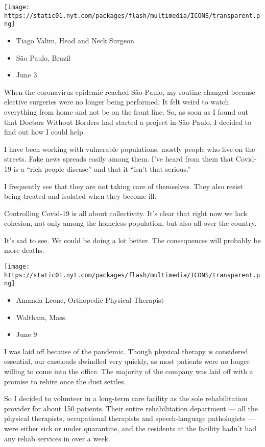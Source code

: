 \texttt{[image: https://static01.nyt.com/packages/flash/multimedia/ICONS/transparent.png]}

\begin{itemize}
\tightlist
\item
  Tiago Valim, Head and Neck Surgeon
\item
  São Paulo, Brazil
\item
  June 3
\end{itemize}

When the coronavirus epidemic reached São Paulo, my routine changed
because elective surgeries were no longer being performed. It felt weird
to watch everything from home and not be on the front line. So, as soon
as I found out that Doctors Without Borders had started a project in São
Paulo, I decided to find out how I could help.

I have been working with vulnerable populations, mostly people who live
on the streets. Fake news spreads easily among them. I've heard from
them that Covid-19 is a ``rich people disease'' and that it ``isn't that
serious.''

I frequently see that they are not taking care of themselves. They also
resist being treated and isolated when they become ill.

Controlling Covid-19 is all about collectivity. It's clear that right
now we lack cohesion, not only among the homeless population, but also
all over the country.

It's sad to see. We could be doing a lot better. The consequences will
probably be more deaths.

\texttt{[image: https://static01.nyt.com/packages/flash/multimedia/ICONS/transparent.png]}

\begin{itemize}
\tightlist
\item
  Amanda Leone, Orthopedic Physical Therapist
\item
  Waltham, Mass.
\item
  June 9
\end{itemize}

I was laid off because of the pandemic. Though physical therapy is
considered essential, our caseloads dwindled very quickly, as most
patients were no longer willing to come into the office. The majority of
the company was laid off with a promise to rehire once the dust settles.

So I decided to volunteer in a long-term care facility as the sole
rehabilitation provider for about 150 patients. Their entire
rehabilitation department --- all the physical therapists, occupational
therapists and speech-language pathologists --- were either sick or
under quarantine, and the residents at the facility hadn't had any rehab
services in over a week.

